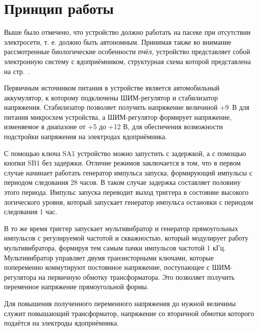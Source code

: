 \section{Принцип работы}

Выше было отмечено, что устройство должно работать на пасеке при отсутствии электросети, т. е. должно быть автономным. Принимая также во внимание рассмотренные биологические особенности пчёл, устройство представляет собой электронную систему с ядоприёмником, структурная схема которой представлена на стр.~\pageref{Structural}.

Первичным источником питания в устройстве является автомобильный аккумулятор, к которому подключены ШИМ-регулятор и стабилизатор напряжения. Стабилизатор позволяет получить напряжение величиной +9~В для питания микросхем устройства, а ШИМ-регулятор формирует напряжение, изменяемое в диапазоне от +5 до +12 В, для обеспечения возможности подстройки напряжения на электродах ядоприёмника.

С помощью ключа SA1 устройство можно запустить с задержкой, а с помощью кнопки SB1 \longndash без задержки. Отличие режимов заключается в том, что в первом случае начинает работать генератор импульса запуска, формирующий импульсы с периодом следования 28 часов. В таком случае задержка составляет половину этого периода. Импульс запуска переводит выход триггера в состояние высокого логического уровня, который запускает генератор импульса остановки с периодом следования 1 час.

В то же время триггер запускает мультивибратор и генератор прямоугольных импульсов с регулируемой частотой и скважностью, который модулирует работу мультивибратора, формируя тем самым пачки импульсов частотой 1 кГц. Мультивибратор управляет двумя транзисторными ключами, которые попеременно коммутируют постоянное напряжение, поступающее с ШИМ-регулятора на первичную обмотку трансформатора. Это позволяет получить переменное напряжение прямоугольной формы.

Для повышения полученного переменного напряжения до нужной величины служит повышающий трансформатор, напряжение со вторичной обмотки которого подаётся на электроды ядоприёмника.



